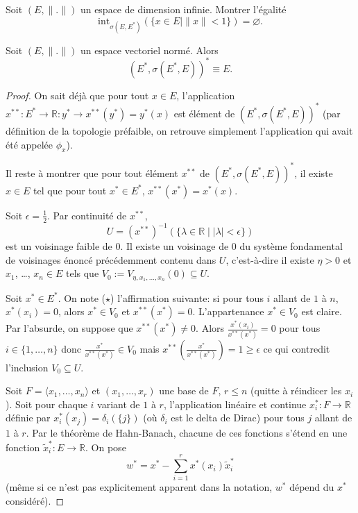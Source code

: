 \begin{exo}
  Soit $(E, \|.\|)$ un espace de dimension infinie. Montrer l'égalité
  $$\mathrm{int}_{\sigma(E, E^*)}(\{x\in E\mid \|x\|<1\})=\varnothing.$$
\end{exo}

\begin{prop}
  Soit $(E, \|.\|)$ un espace vectoriel normé. Alors
  $$(E^*, \sigma(E^*, E))^*\equiv E.$$
\end{prop}
\begin{proof}
  On sait déjà que pour tout $x\in E$, l'application
  $x^{**}: E^*\to \mathbb R: y^*\to x^{**}(y^*) = y^*(x)$ est
  élément de $(E^*, \sigma(E^*, E))^*$ (par définition de la
  topologie préfaible, on retrouve simplement l'application
  qui avait été appelée $\phi_x$).

  Il reste à montrer que pour tout élément $x^{**}$ de
  $(E^*, \sigma(E^*, E))^*$, il existe $x\in E$ tel que
  pour tout $x^*\in E^*$, $x^{**}(x^*) = x^*(x)$.

  Soit $\epsilon=\frac{1}{2}$. Par continuité de $x^{**}$,
  $$U = (x^{**})^{-1}\left(\{\lambda\in\mathbb R\mid
    |\lambda|<\epsilon\}\right)$$
  est un voisinage faible de $0$. Il existe un voisinage de $0$ du système
  fondamental de voisinages énoncé précédemment contenu dans $U$, c'est-à-dire
  il existe $\eta > 0$ et $x_1$,
  \ldots, $x_n\in E$ tels que $V_0:=V_{\eta, x_1, \ldots, x_n}(0)\subseteq U$.

  Soit $x^*\in E^*$. On note ($\star$) l'affirmation suivante:
  si pour tous $i$ allant de $1$ à $n$,
  $x^*(x_i) = 0$, alors $x^*\in V_0$ et $x^{**}(x^*) = 0$.
  L'appartenance $x^*\in V_0$ est claire. Par l'absurde,
  on suppose que $x^{**}(x^*)\neq 0$. Alors $\frac{x^*(x_i)}{x^{**}(x^*)}=0$
  pour tous $i\in\{1, \ldots, n\}$ donc $\frac{x^*}{x^{**}(x^*)}\in
  V_0$ mais
  $x^{**}\left( \frac{x^*}{x^{**}(x^*)}\right)=1\geq\epsilon$ ce qui contredit
  l'inclusion $V_0\subseteq U$.

  Soit $F = \langle x_1, \ldots, x_n\rangle$ et $(x_1, \ldots, x_r)$ une base
  de $F$, $r\leq n$ (quitte à réindicer les $x_i$). Soit pour
  chaque $i$ variant de $1$ à $r$, l'application linéaire et continue
  $x^*_i:F\to\mathbb R$  définie par $x^*_i(x_j) =
  \delta_{i}(\{j\})$ (où $\delta_i$ est le delta de Dirac) pour tous $j$
  allant de $1$ à $r$.
  Par le théorème de Hahn-Banach, chacune de ces fonctions s'étend
  en une fonction $\widetilde{x}_i^*: E\to \mathbb R$.
  On pose $$w^* = x^* - \sum_{i=1}^rx^*(x_i)\widetilde{x}_i^*$$
  (même si ce n'est pas explicitement apparent dans la notation,
  $w^*$ dépend du $x^*$ considéré).


\end{proof}
